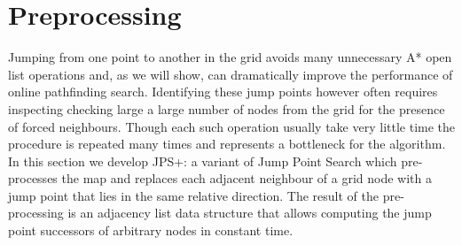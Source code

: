 \section{Preprocessing}
\label{sec::preprocessing}
%
%

Jumping from one point to another in the grid avoids many unnecessary A* open
list operations and, as we will show, can dramatically improve the performance 
of online pathfinding search.
Identifying these jump points however often requires inspecting checking large
a large number of nodes from the grid for the presence of forced neighbours.
Though each such operation usually take very little time the procedure is 
repeated many times and represents a bottleneck for the algorithm.  In
this section we develop JPS+: a variant of Jump Point Search which
pre-processes the map and replaces each adjacent neighbour of a grid node with
a jump point that lies in the same relative direction. The result of the
pre-processing is an adjacency list data structure that allows computing the
jump point successors of arbitrary nodes in constant time.


